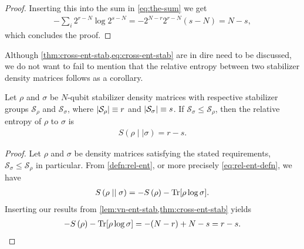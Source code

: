 \begin{proof}
   Inserting this into the sum in \cref{eq:the-sum} we get
   \begin{align}
      -\sum_i 2^{r-N} \log 2^{s-N} =
      -2^{N-r}2^{r-N}\left(s-N\right)= N-s
   ,\end{align}
   which concludes the proof.
\end{proof}

Although \cref{thm:cross-ent-stab,eq:cross-ent-stab} are in dire need to be
discussed, we do not want to fail to mention that the relative entropy between
two stabilizer density matrices follows as a corollary.

\begin{cor}\label{col:rel-ent-stab}
  Let $\rho$ and $\sigma$ be $N$-qubit stabilizer density matrices with
  respective stabilizer groups $\mathcal{S}_\rho$ and $\mathcal{S}_\sigma$,
  where $\abs{\mathcal{S}_\rho}
  \equiv r$ and $\abs{\mathcal{S}_\sigma} \equiv s$. If $\mathcal{S}_\sigma \leq
  \mathcal{S}_\rho$, then the relative entropy of $\rho$ to
  $\sigma$ is
  \begin{align}
    S\left(\rho\mid\mid\sigma\right) = r - s
  .\end{align}
\end{cor}

\begin{proof}
  Let $\rho$ and $\sigma$ be density matrices satisfying the stated
  requirements, $\mathcal{S}_\sigma \leq \mathcal{S}_\rho$ in particular. From \cref{defn:rel-ent},
  or more precisely \cref{eq:rel-ent-defn}, we have
  \begin{align}
    S\left( \rho\mid\mid\sigma \right) = -S\left( \rho \right)
    -\Tr[\rho\log\sigma]
  .\end{align}
  Inserting our results from \cref{lem:vn-ent-stab,thm:cross-ent-stab} yields
  \begin{align}
    -S\left( \rho \right) -\Tr[\rho\log\sigma] = -(N-r) + N - s = r - s
  .\end{align}
\end{proof}

